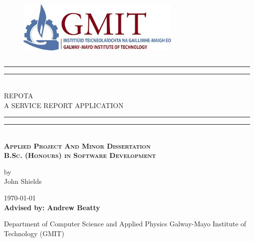 \documentclass{book}
\newcommand*{\customTitle}{\begingroup %
\centering %
\vspace*{\baselineskip} %

\rule{\textwidth}{1.6pt}\vspace*{-\baselineskip}\vspace*{2pt} %
\rule{\textwidth}{0.4pt}\\[\baselineskip] %

{\Large REPOTA \\[2ex] A SERVICE REPORT APPLICATION}\\[0.2\baselineskip] %


\rule{\textwidth}{0.4pt}\vspace*{-\baselineskip}\vspace{3.2pt} %
\rule{\textwidth}{1.6pt}\\[\baselineskip] %
\scshape %
\Large \textbf{Applied Project And Minor Dissertation}\\
\textbf{B.Sc. (Honours) in Software Development}\par %
\normalsize
\vspace*{2\baselineskip} %

{by \\ John Shields\par}

\vspace*{2\baselineskip} %
\vfill %
{\scshape \today} \\[0.3\baselineskip] %

{\textbf{Advised by: Andrew Beatty}}\par %

{Department of Computer Science and Applied Physics Galway-Mayo Institute of Technology (GMIT)}\par %


\endgroup}
\begin{document}
 
\begin{figure}
\begin{center}
\includegraphics[width=8cm,height=3.3cm,keepaspectratio]{images/misc/gmit-logo.jpg} %
\end{center}
\end{figure}
\customTitle %
\tableofcontents
\listoffigures
{} 










\end{document}
